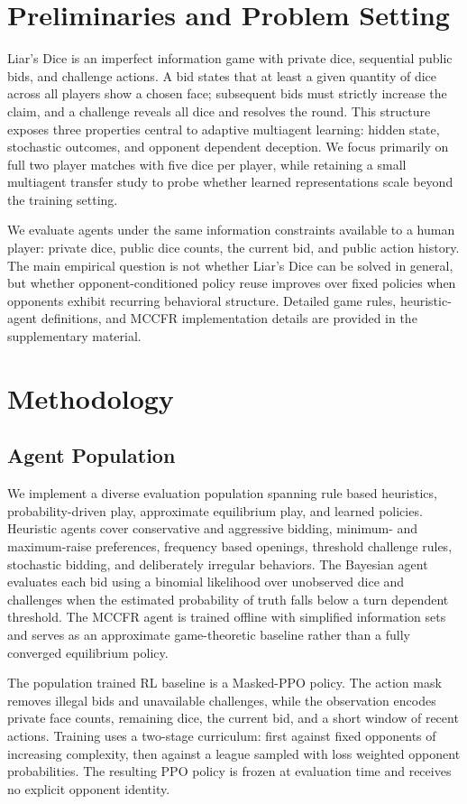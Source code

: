 \documentclass[letterpaper]{article} %
\begin{document}
\section{Preliminaries and Problem Setting}
Liar's Dice is an imperfect information game with private dice, sequential public bids, and challenge actions. A bid states that at least a given quantity of dice across all players show a chosen face; subsequent bids must strictly increase the claim, and a challenge reveals all dice and resolves the round. This structure exposes three properties central to adaptive multiagent learning: hidden state, stochastic outcomes, and opponent dependent deception. We focus primarily on full two player matches with five dice per player, while retaining a small multiagent transfer study to probe whether learned representations scale beyond the training setting.

We evaluate agents under the same information constraints available to a human player: private dice, public dice counts, the current bid, and public action history. The main empirical question is not whether Liar's Dice can be solved in general, but whether opponent-conditioned policy reuse improves over fixed policies when opponents exhibit recurring behavioral structure. Detailed game rules, heuristic-agent definitions, and MCCFR implementation details are provided in the supplementary material.


\section{Methodology}
\subsection{Agent Population}
We implement a diverse evaluation population spanning rule based heuristics, probability-driven play, approximate equilibrium play, and learned policies. Heuristic agents cover conservative and aggressive bidding, minimum- and maximum-raise preferences, frequency based openings, threshold challenge rules, stochastic bidding, and deliberately irregular behaviors. The Bayesian agent evaluates each bid using a binomial likelihood over unobserved dice and challenges when the estimated probability of truth falls below a turn dependent threshold. The MCCFR agent is trained offline with simplified information sets and serves as an approximate game-theoretic baseline rather than a fully converged equilibrium policy.

The population trained RL baseline is a Masked-PPO policy. The action mask removes illegal bids and unavailable challenges, while the observation encodes private face counts, remaining dice, the current bid, and a short window of recent actions. Training uses a two-stage curriculum: first against fixed opponents of increasing complexity, then against a league sampled with loss weighted opponent probabilities. The resulting PPO policy is frozen at evaluation time and receives no explicit opponent identity.
\end{document}
